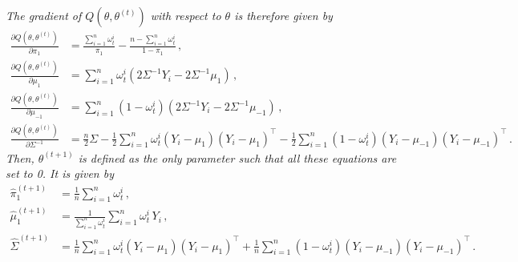 \documentclass[a4paper,10pt,fleqn]{article}
\newcommand{\eqsp}{\,}
\newcommand{\1}{\ensuremath{\mathbbm{1}}}
\begin{document}
\begin{enumerate}
{\em
The gradient of $Q(\theta,\theta^{(t)})$ with respect to $\theta$ is therefore given by
\begin{align*}
\frac{\partial Q(\theta,\theta^{(t)})}{\partial \pi_1} &= \frac{\sum_{i=1}^n\omega_t^i}{\pi_1} - \frac{n-\sum_{i=1}^n\omega_t^i}{1-\pi_{1}}\eqsp,\\
\frac{\partial Q(\theta,\theta^{(t)})}{\partial \mu_1} &= \sum_{i=1}^n\omega_t^i\left(2\Sigma^{-1}Y_i - 2\Sigma^{-1}\mu_{1}\right)\eqsp,\\
\frac{\partial Q(\theta,\theta^{(t)})}{\partial \mu_{-1}} &= \sum_{i=1}^n(1-\omega_t^i)\left(2\Sigma^{-1}Y_i - 2\Sigma^{-1}\mu_{-1}\right)\eqsp,\\
\frac{\partial Q(\theta,\theta^{(t)})}{\partial \Sigma^{-1}} &= \frac{n}{2}\Sigma -  \frac{1}{2}\sum_{i=1}^n\omega_t^i\left(Y_i - \mu_{1}\right)\left(Y_i - \mu_{1}\right)^\top -  \frac{1}{2}\sum_{i=1}^n(1-\omega_t^i)\left(Y_i - \mu_{-1}\right)\left(Y_i - \mu_{-1}\right)^\top\eqsp.
\end{align*}
Then, $\theta^{(t+1)}$ is defined as the only parameter such that all these equations are set to 0. It is given by
\begin{align*}
\widehat \pi_1^{(t+1)} &= \frac{1}{n}\sum_{i=1}^n\omega_t^i\eqsp,\\
\widehat \mu_1^{(t+1)} &= \frac{1}{\sum_{i=1}^n\omega_t^i}\sum_{i=1}^n\omega_t^i\,Y_i\eqsp,\\
\widehat\Sigma^{(t+1)} &= \frac{1}{n}\sum_{i=1}^n\omega_t^i\left(Y_i - \mu_{1}\right)\left(Y_i - \mu_{1}\right)^\top +  \frac{1}{n}\sum_{i=1}^n(1-\omega_t^i)\left(Y_i - \mu_{-1}\right)\left(Y_i - \mu_{-1}\right)^\top\eqsp.
\end{align*}}
\end{enumerate}
\end{document}
